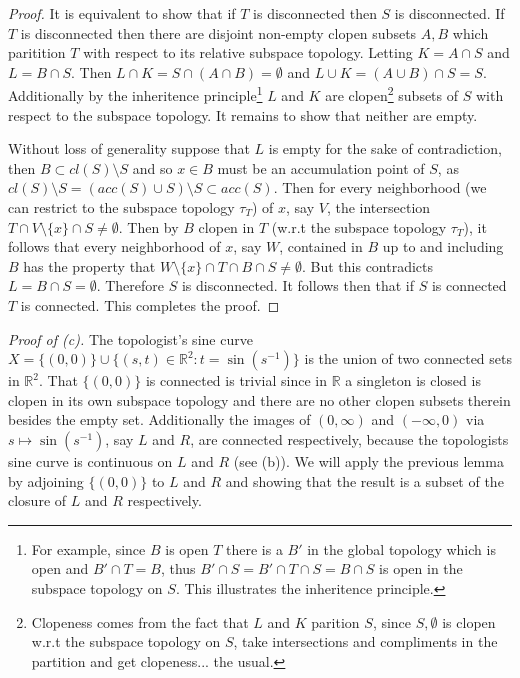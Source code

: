 \documentclass[11pt]{amsart}
\theoremstyle{definition}
\numberwithin{theorem}{section}
\numberwithin{definition}{section}
\numberwithin{equation}{section}
\begin{document}
\begin{proof} 
	It is equivalent to show that if $T$ is disconnected then $S$ is disconnected. If $T$ is disconnected then
	there are disjoint non-empty clopen subsets $A, B$ which paritition $T$ with respect to its relative subspace topology.
	Letting $K = A \cap S$ and $L = B \cap S$. Then $L \cap K = S \cap (A \cap B) = \emptyset$ and $L \cup K = (A \cup B) \cap S = S$. Additionally by the inheritence principle\footnote{For example, since $B$ is open $T$ there is a $B'$ in the global topology which is open and $B' \cap T = B$, thus $B' \cap S = B' \cap T \cap S = B \cap S$ is open in the subspace topology on $S$. This illustrates the inheritence principle.} $L$ and $K$ are clopen\footnote{Clopeness comes from the fact that $L$ and $K$ parition $S$, since $S, \emptyset$ is clopen w.r.t the subspace topology on $S$, take intersections and compliments in the partition and get clopeness... the usual. } subsets of $S$ with respect to the subspace topology. It remains to show that neither are empty.

	Without loss of generality suppose that $L$ is empty for the sake of contradiction, then $B \subset cl(S) \setminus S$
	and so $x \in B$ must be an accumulation point of $S$, as $cl(S) \setminus S = (acc(S) \cup S) \setminus S \subset acc(S).$ Then for every neighborhood (we can restrict to the subspace topology $\tau_T$) of $x$, say $V$, the intersection $T \cap V \setminus\{x\} \cap S \neq \emptyset$.  Then by $B$ clopen in $T$ (w.r.t the subspace topology $\tau_T$), it follows that every neighborhood of $x$, say $W$, contained in $B$ up to and including $B$ has the property that $W \setminus\{x\} \cap T \cap B \cap S \neq \emptyset$. But this contradicts $L = B \cap S = \emptyset$. Therefore $S$ is disconnected.
	It follows then that if $S$ is connected $T$ is connected. This completes the proof.
\end{proof}
\noindent \emph{Proof of (c).} 
The topologist's sine curve $X = \{(0,0)\} \cup \{(s,t) \in \mathbb{R}^2 : t = \sin(s^{-1})\}$ is the
union of two connected sets in $\mathbb{R}^2$. That $\{(0,0)\}$ is connected is trivial since in $\mathbb{R}$ a singleton is closed is clopen in its own subspace topology and there are no other clopen subsets therein besides the empty set.
Additionally the images of $(0,\infty)$ and $(-\infty, 0)$ via $s \mapsto \sin(s^{-1})$, say $L$ and $R$, are connected respectively, because the topologists sine curve is continuous on $L$ and $R$ (see (b)). We will apply the previous lemma by adjoining $\{(0,0)\}$ to $L$ and $R$ and showing that the result is a subset of the closure of $L$ and $R$ respectively.
\end{document}
